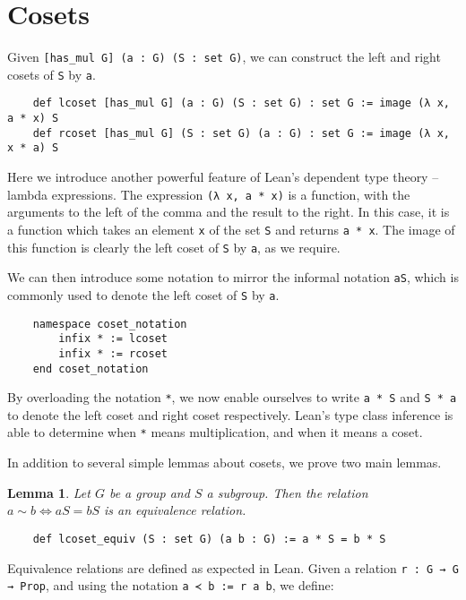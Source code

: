 \documentclass[runningheads,a4paper]{llncs}
\renewcommand{\-}{\setminus}
\newtheorem{lemma}[theorem]{Lemma}
\begin{document}
\section{Cosets}

Given \lstinline{[has_mul G] (a : G) (S : set G)}, we can construct the left and right cosets of \lstinline{S} by \lstinline{a}.

\begin{lstlisting}
    def lcoset [has_mul G] (a : G) (S : set G) : set G := image (λ x, a * x) S
    def rcoset [has_mul G] (S : set G) (a : G) : set G := image (λ x, x * a) S
\end{lstlisting}

Here we introduce another powerful feature of Lean's dependent type theory -- lambda expressions. The expression \lstinline{(λ x, a * x)} is a function, with the arguments to the left of the comma and the result to the right. In this case, it is a function which takes an element \lstinline{x} of the set \lstinline{S} and returns \lstinline{a * x}. The image of this function is clearly the left coset of \lstinline{S} by \lstinline{a}, as we require.

We can then introduce some notation to mirror the informal notation \lstinline{aS}, which is commonly used to denote the left coset of \lstinline{S} by \lstinline{a}.

\begin{lstlisting}
    namespace coset_notation
        infix * := lcoset
        infix * := rcoset
    end coset_notation
\end{lstlisting}

By overloading the notation \lstinline{*}, we now enable ourselves to write \lstinline{a * S} and \lstinline{S * a} to denote the left coset and right coset respectively. Lean's type class inference is able to determine when \lstinline{*} means multiplication, and when it means a coset.

In addition to several simple lemmas about cosets, we prove two main lemmas.

\begin{lemma}
Let $G$ be a group and $S$ a subgroup. Then the relation $a \sim b \iff aS = bS$ is an equivalence relation.
\end{lemma}

\begin{lstlisting}
    def lcoset_equiv (S : set G) (a b : G) := a * S = b * S
\end{lstlisting}

Equivalence relations are defined as expected in Lean. Given a relation \lstinline{r : G → G → Prop}, and using the notation \lstinline{a ≺ b := r a b}, we define:
\end{document}
